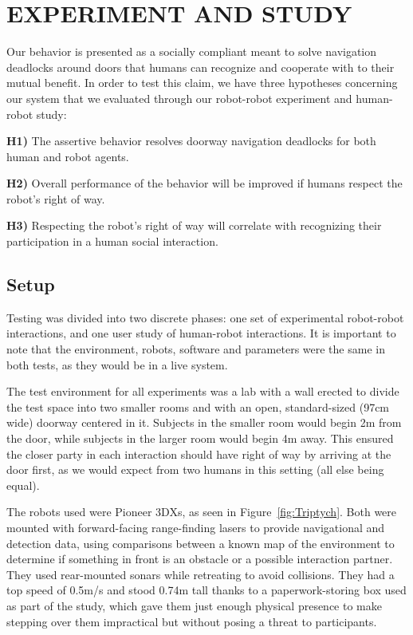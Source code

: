 \documentclass[letterpaper, 10 pt, conference]{ieeeconf}  %
\begin{document}
\section{EXPERIMENT AND STUDY}

Our behavior is presented as a socially compliant meant to solve navigation deadlocks around doors that humans can recognize and cooperate with to their mutual benefit. In order to test this claim, we have three hypotheses concerning our system that we evaluated through our robot-robot experiment and human-robot study:

\textbf{H1)} The assertive behavior resolves doorway navigation deadlocks for both human and robot agents.

\textbf{H2)} Overall performance of the behavior will be improved if humans respect the robot's right of way.

\textbf{H3)} Respecting the robot's right of way will correlate with recognizing their participation in a human social interaction.


\subsection{Setup}

Testing was divided into two discrete phases: one set of experimental robot-robot interactions, and one user study of human-robot interactions. It is important to note that the environment, robots, software and parameters were the same in both tests, as they would be in a live system.

The test environment for all experiments was a lab with a wall erected to divide the test space into two smaller rooms and with an open, standard-sized (97cm wide) doorway centered in it. Subjects in the smaller room would begin 2m from the door, while subjects in the larger room would begin 4m away. This ensured the closer party in each interaction should have right of way by arriving at the door first, as we would expect from two humans in this setting (all else being equal).

The robots used were Pioneer 3DXs, as seen in Figure~\ref{fig:Triptych}. Both were mounted with forward-facing range-finding lasers to provide navigational and detection data, using comparisons between a known map of the environment to determine if something in front is an obstacle or a possible interaction partner. They used rear-mounted sonars while retreating to avoid collisions. They had a top speed of 0.5m/s and stood 0.74m tall thanks to a paperwork-storing box used as part of the study, which gave them just enough physical presence to make stepping over them impractical but without posing a threat to participants.
\end{document}
